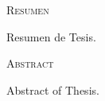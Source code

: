 
\cleardoublepage
\thispagestyle{plain}
{}
\begin{center}
    \vspace*{\fill}
    {\Huge{\textsc{Resumen}}}\\[1cm]

    \begin{minipage}{0.7\textwidth}
        Resumen de Tesis.
    \end{minipage}

    \vspace*{\fill}

\end{center}



\cleardoublepage
\thispagestyle{plain}
{}
\begin{center}
    \vspace*{\fill}
    {\Huge{\textsc{Abstract}}}\\[1cm]

    \begin{minipage}{0.7\textwidth}
        Abstract of Thesis.
    \end{minipage}

    \vspace*{\fill}

\end{center}
